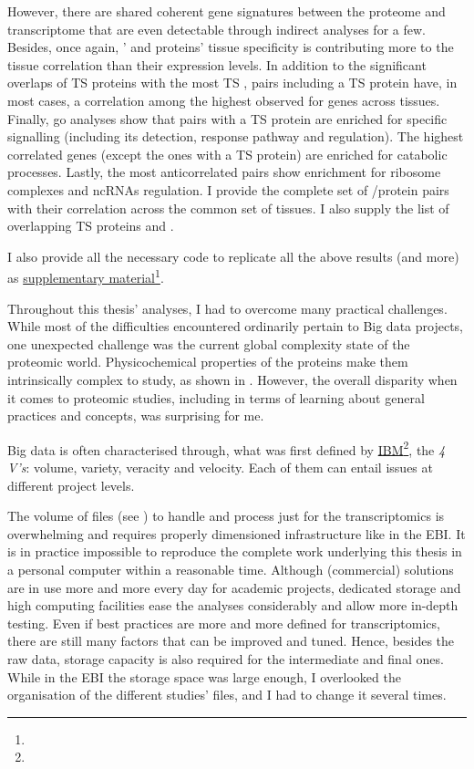 However, there are shared coherent gene signatures
between the proteome and transcriptome
that are even detectable through indirect analyses for a few.
Besides, once again,
\mRNAs{}' and proteins' tissue specificity is contributing
more to the tissue correlation than their expression levels.
In addition to the significant overlaps of \gls{TS} proteins
with the most \gls{TS} \mRNAs,
pairs including a \gls{TS} protein have,
in most cases,
a correlation among the highest observed for genes across tissues.
Finally, \gls{go} analyses show that pairs with a \gls{TS} protein
are enriched for specific signalling
(including its detection, response pathway and regulation).
The highest correlated genes (except the ones with a \gls{TS} protein) are
enriched for catabolic processes.
Lastly, the most anticorrelated pairs show enrichment
for ribosome complexes and \glspl{ncRNA} regulation.
I provide the complete set of \mRNA/protein pairs with their correlation
across the common set of tissues.
I also supply the list of overlapping \gls{TS} proteins and \mRNAs{}.

I also provide all the necessary code to replicate all the above results (and more)
as \href{https://github.com/barzine/BaselineAtlas/tree/thesis.}{supplementary
material}\footnote{}.


Throughout this thesis' analyses,
I had to overcome many practical challenges.
While most of the difficulties encountered ordinarily pertain to Big data projects,
one unexpected challenge was
the current global complexity state of the proteomic world.
Physicochemical properties of the proteins make them
intrinsically complex to study,
as shown in .
However, the overall disparity
when it comes to proteomic studies,
including in terms of learning about general practices and concepts,
was surprising for me.

Big data is often characterised through, what was first defined by
\href{https://www.ibm.com}{IBM}\footnote{},
the \emph{4 V's}: volume, variety, veracity and velocity.
Each of them can entail issues at different project levels.

The volume of files (see )
to handle and process just for the transcriptomics
is overwhelming and requires properly dimensioned infrastructure
like in the \gls{EBI}.
It is in practice impossible to reproduce the complete work underlying
this thesis in a personal computer within a reasonable time.
Although (commercial) solutions are in use more and more every day
for academic projects,
dedicated storage and high computing facilities ease the analyses considerably
and allow more in-depth testing.
Even if best practices are more and more defined for transcriptomics,
there are still many factors that can be improved and tuned.
Hence, besides the raw data,
storage capacity is also required for the intermediate and final ones.
While in the \gls{EBI} the storage space was large enough,
I overlooked the organisation of the different studies' files,
and I had to change it several times.

